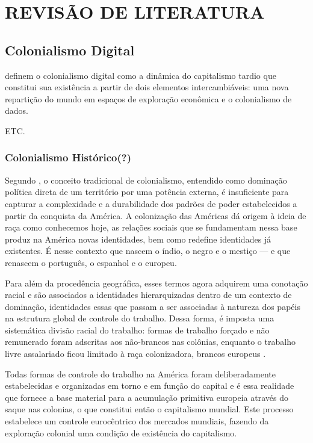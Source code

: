 
\chapter{REVISÃO DE LITERATURA}
\label{chap:revisaodeliteratura}

\section{Colonialismo Digital}
\label{sec:colDados}

 definem o colonialismo digital como a dinâmica do capitalismo tardio que constitui sua existência a partir de dois elementos intercambiáveis: uma nova repartição do mundo em espaços de exploração econômica e o colonialismo de dados.

ETC.

\subsection{Colonialismo Histórico(?)}
\label{subsec:colHist}

Segundo , o conceito tradicional de colonialismo, entendido como dominação política direta de um território por uma potência externa, é insuficiente para capturar a complexidade e a durabilidade dos padrões de poder estabelecidos a partir da conquista da América. A  colonização das Américas dá origem à ideia de raça como conhecemos hoje, as relações sociais que se fundamentam nessa base produz na América novas identidades, bem como redefine identidades já existentes. É nesse contexto que nascem o índio, o negro e o mestiço — e que renascem o  português, o espanhol e o europeu. 

Para além da procedência geográfica, esses termos agora adquirem uma conotação racial e são associados a identidades hierarquizadas dentro de um contexto de dominação, identidades essas que passam a ser associadas à natureza dos papéis na estrutura global de controle do trabalho. Dessa forma, é imposta uma sistemática divisão racial do trabalho: formas de trabalho forçado e não remunerado foram adscritas aos não-brancos nas colônias, enquanto o trabalho livre assalariado ficou limitado à raça colonizadora, brancos europeus \cite{quijano2005}. 


Todas formas de controle do trabalho na América foram deliberadamente estabelecidas e organizadas em torno e em função do capital e é essa realidade que fornece a base material para a acumulação primitiva europeia através do saque nas colonias, o que constitui então o capitalismo mundial. Este processo estabelece um controle eurocêntrico dos mercados mundiais, fazendo da exploração colonial uma condição de existência do capitalismo.


